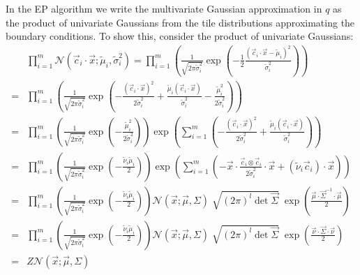 \documentclass[11pt,twoside]{report}
\begin{document}
In the EP algorithm we write the multivariate Gaussian approximation in $q$ as the product of univariate Gaussians from the tile distributions approximating the boundary conditions.
To show this, consider the product of univariate Gaussians:
\begin{align}
    &
    \prod_{i=1}^m
    \mathcal{N}(\vec{c}_i \cdot \vec{x}; \tilde{\mu}_i, \tilde{\sigma}_i^2)
    =
    \prod_{i=1}^m
    \left(
    \frac{1}{\sqrt{ 2\pi \tilde{\sigma}_i^2 }}
    \exp{\left(
      - \frac{1}{2} \frac{(\vec{c}_i \cdot \vec{x} - \tilde{\mu}_i)^2}{\tilde{\sigma}_i^2}
      \right)}
    \right)
    \nonumber \\ =&
    \prod_{i=1}^m
    \left(
    \frac{1}{\sqrt{ 2\pi \tilde{\sigma}_i^2 }}
    \exp{\left(
      - \frac{(\vec{c}_i \cdot \vec{x})^2}{2\tilde{\sigma}_i^2}
      + \frac{\tilde{\mu}_i(\vec{c}_i \cdot \vec{x})}{\tilde{\sigma}_i^2}
      - \frac{\tilde{\mu}_i^2}{2\tilde{\sigma}_i^2}
      \right)}
    \right)
    \nonumber \\ =&
    \prod_{i=1}^m
    \left(
    \frac{1}{\sqrt{ 2\pi \tilde{\sigma}_i^2 }}
    \exp{\left(-\frac{\tilde{\mu}_i^2}{2\tilde{\sigma}_i^2}\right)}
    \right)
    \exp{\left( \sum_{i=1}^m \left(
      - \frac{(\vec{c}_i \cdot \vec{x})^2}{2\tilde{\sigma}_i^2}
      + \frac{\tilde{\mu}_i(\vec{c}_i \cdot \vec{x})}{\tilde{\sigma}_i^2}
      \right) \right)}
    \nonumber \\ =&
    \prod_{i=1}^m
    \left(
    \frac{1}{\sqrt{ 2\pi \tilde{\sigma}_i^2 }}
    \exp{\left(-\frac{\tilde{\nu}_i \tilde{\mu}_i}{2}\right)}
    \right)
    \exp{\left( \sum_{i=1}^m \left(
      - \vec{x} \cdot \frac{\vec{c}_i \otimes \vec{c}_i}{2\tilde{\sigma}_i^2} \cdot \vec{x}
      + (\tilde{\nu}_i\vec{c}_i) \cdot \vec{x}
      \right) \right)}
    \nonumber \\ =&
    \prod_{i=1}^m
    \left(
    \frac{1}{\sqrt{ 2\pi \tilde{\sigma}_i^2 }}
    \exp{\left(-\frac{\tilde{\nu}_i \tilde{\mu}_i}{2}\right)}
    \right)
    \mathcal{N}(\vec{x}; \vec{\mu}, \Sigma)
    \;
    \sqrt{ (2\pi)^l \det{\vec{\Sigma}} }
    \;
    \exp{\left( \frac{\vec{\mu} \cdot \vec{\Sigma}^{-1} \cdot \vec{\mu}}{2} \right)}
    \nonumber \\ =&
    \prod_{i=1}^m
    \left(
    \frac{1}{\sqrt{ 2\pi \tilde{\sigma}_i^2 }}
    \exp{\left(-\frac{\tilde{\nu}_i \tilde{\mu}_i}{2}\right)}
    \right)
    \mathcal{N}(\vec{x}; \vec{\mu}, \Sigma)
    \;
    \sqrt{ (2\pi)^l \det{\vec{\Sigma}} }
    \;
    \exp{\left( \frac{\vec{\nu} \cdot \vec{\Sigma} \cdot \vec{\nu}}{2} \right)}
    \nonumber \\ =&
    Z \mathcal{N}(\vec{x}; \vec{\mu}, \Sigma)
  \label{eq:combined-normals}
\end{align}
\end{document}
